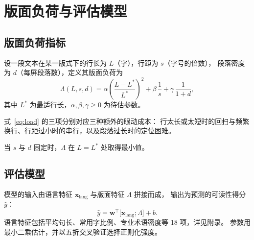 \chapter{版面负荷与评估模型}
\label{chap:method}

\section{版面负荷指标}

\begin{definition}[版面负荷]
  设一段文本在某一版式下的行长为 $L$（字），行距为 $s$（字号的倍数），
  段落密度为 $d$（每屏段落数），定义其版面负荷为
  \begin{equation}
    \label{eq:load}
    \Lambda(L, s, d) = \alpha \left( \frac{L - L^{*}}{L^{*}} \right)^{2}
      + \beta \, \frac{1}{s} + \gamma \, \frac{1}{1 + d},
  \end{equation}
  其中 $L^{*}$ 为最适行长，$\alpha, \beta, \gamma \geqslant 0$ 为待估参数。
\end{definition}

式~\eqref{eq:load} 的三项分别对应三种额外的眼动成本：
行太长或太短时的回扫与频繁换行、行距过小时的串行，以及段落过长时的定位困难。

\begin{proposition}
  当 $s$ 与 $d$ 固定时，$\Lambda$ 在 $L = L^{*}$ 处取得最小值。
\end{proposition}

\section{评估模型}

模型的输入由语言特征 $\symbf{x}_{\text{lang}}$ 与版面特征 $\Lambda$ 拼接而成，
输出为预测的可读性得分 $\hat{y}$：
\begin{equation}
  \hat{y} = \symbf{w}^{\top} \bigl[ \symbf{x}_{\text{lang}} ; \Lambda \bigr] + b .
\end{equation}
语言特征包括平均句长、常用字比例、专业术语密度等 18 项，详见附录。
参数用最小二乘估计，并以五折交叉验证选择正则化强度。
